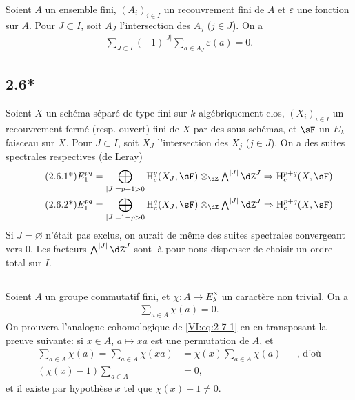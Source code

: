 Soient $A$ un ensemble fini, $(A_i)_{i\in I}$ un recouvrement fini de $A$ et 
$\varepsilon$ une fonction sur $A$. Pour $J\subset I$, soit $A_J$ 
l'intersection des $A_j$ ($j\in J$). On a 
\begin{align*}\tag{2.6.1}\label{VI:eq:2-6-1}
  \sum_{J\subset I} (-1)^{|J|} \sum_{a\in A_J} \varepsilon(a) = 0 \text{.}
\end{align*}





\subsection*{2.6*}\label{VI:2-6*}

Soient $X$ un schéma séparé de type fini sur $k$ algébriquement clos, 
$(X_i)_{i\in I}$ un recouvrement fermé (resp. ouvert) fini de $X$ par des 
sous-schémas, et $\sF$ un $E_\lambda$-faisceau sur $X$. Pour $J\subset I$, 
soit $X_J$ l'intersection des $X_j$ ($j\in J$). On a des suites spectrales 
respectives (de Leray) 
\begin{align*}\tag{2.6.1*}\label{VI:eq:2-6-1*}
  E_1^{p q} &= \bigoplus_{|J|=p+1>0} \h_c^q(X_J,\sF) \otimes_\dZ \textstyle\bigwedge^{|J|} \dZ^J \Rightarrow \h_c^{p+q}(X,\sF) \\ 
  \tag{2.6.2*}\label{VI:eq:2-6-2*}
  E_1^{p q} &= \bigoplus_{|J|=1-p>0} \h_c^q(X_J,\sF) \otimes_\dZ \textstyle\bigwedge^{|J|} \dZ^J \Rightarrow \h_c^{p+q}(X,\sF)
\end{align*}
Si $J=\varnothing$ n'était pas exclus, on aurait de même des suites 
spectrales convergeant vers $0$. Les facteurs $\bigwedge^{|J|} \dZ^J$ sont là 
pour nous dispenser de choisir un ordre total sur $I$. 





\subsection{}\label{VI:2-7}

Soient $A$ un groupe commutatif fini, et $\chi:A \to E_\lambda^\times$ un 
caractère non trivial. On a 
\begin{align*}\tag{2.7.1}\label{VI:eq:2-7-1}
  \sum_{a\in A} \chi(a) = 0 \text{.}
\end{align*}
On prouvera l'analogue cohomologique de \eqref{VI:eq:2-7-1} en en transposant 
la preuve suivante: si $x\in A$, $a\mapsto x a$ est une permutation de $A$, et 
\begin{align*}
  \sum_{a\in A}\chi(a) = \sum_{a\in A} \chi(x a) &= \chi(x) \sum_{a\in A} \chi(a) && \text{, d'où} \\
  (\chi(x)-1)\sum_{a\in A} &= 0 \text{,}
\end{align*}
et il existe par hypothèse $x$ tel que $\chi(x)-1\ne 0$. 





